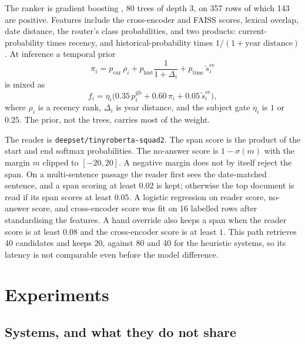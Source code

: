 \documentclass[11pt,letterpaper]{article}
\begin{document}
The ranker is gradient boosting \cite{friedman2001gbm}, 80 trees of depth 3, on 357 rows of which 143 are positive.
Features include the cross-encoder and FAISS scores, lexical overlap, date distance, the router's class probabilities, and two products: current-probability times recency, and historical-probability times $1/(1+\text{year distance})$.
At inference a temporal prior
\begin{equation}
\pi_i
= p_{\mathrm{cur}}\,\rho_i
+ p_{\mathrm{hist}}\frac{1}{1+\Delta_i}
+ p_{\mathrm{time}}\,\tilde{s}^{\mathrm{ce}}_i
\label{eq:prior}
\end{equation}
is mixed as
\begin{equation}
f_i = \eta_i\big(0.35\,p^{\mathrm{gb}}_i + 0.60\,\pi_i + 0.05\,\tilde{s}^{\mathrm{ce}}_i\big),
\label{eq:learnedrank}
\end{equation}
where $\rho_i$ is a recency rank, $\Delta_i$ is year distance, and the subject gate $\eta_i$ is $1$ or $0.25$.
The prior, not the trees, carries most of the weight.

The reader is \texttt{deepset/tinyroberta-squad2}.
The span score is the product of the start and end softmax probabilities.
The no-answer score is $1-\sigma(m)$ with the margin $m$ clipped to $[-20,20]$.
A negative margin does not by itself reject the span.
On a multi-sentence passage the reader first sees the date-matched sentence, and a span scoring at least $0.02$ is kept; otherwise the top document is read if its span scores at least $0.05$.
A logistic regression on reader score, no-answer score, and cross-encoder score was fit on 16 labelled rows after standardising the features.
A hand override also keeps a span when the reader score is at least $0.08$ and the cross-encoder score is at least $1$.
This path retrieves 40 candidates and keeps 20, against 80 and 40 for the heuristic systems, so its latency is not comparable even before the model difference.

\section{Experiments}
\label{sec:exp}

\subsection{Systems, and what they do not share}
\end{document}
